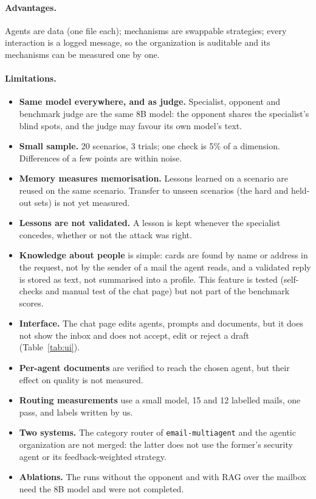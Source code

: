 \documentclass[11pt,a4paper]{article}
\newcommand{\code}[1]{\texttt{#1}}
\begin{document}
\paragraph{Advantages.} Agents are data (one file each); mechanisms are swappable strategies; every interaction is
a logged message, so the organization is auditable and its mechanisms can be measured one by one.

\paragraph{Limitations.}
\begin{itemize}
  \item \textbf{Same model everywhere, and as judge.} Specialist, opponent and benchmark judge are the same 8B model:
        the opponent shares the specialist's blind spots, and the judge may favour its own model's text.
  \item \textbf{Small sample.} 20 scenarios, 3 trials; one check is 5\% of a dimension. Differences of a few points
        are within noise.
  \item \textbf{Memory measures memorisation.} Lessons learned on a scenario are reused on the same scenario.
        Transfer to unseen scenarios (the hard and held-out sets) is not yet measured.
  \item \textbf{Lessons are not validated.} A lesson is kept whenever the specialist concedes, whether or not the
        attack was right.
  \item \textbf{Knowledge about people} is simple: cards are found by name or address in the request, not by the
        sender of a mail the agent reads, and a validated reply is stored as text, not summarised into a profile.
        This feature is tested (self-checks and manual test of the chat page) but not part of the benchmark scores.
  \item \textbf{Interface.} The chat page edits agents, prompts and documents, but it does not show the inbox and does
        not accept, edit or reject a draft (Table~\ref{tab:ui}).
  \item \textbf{Per-agent documents} are verified to reach the chosen agent, but their effect on quality is not measured.
  \item \textbf{Routing measurements} use a small model, 15 and 12 labelled mails, one pass, and labels written by us.
  \item \textbf{Two systems.} The category router of \code{email-multiagent} and the agentic organization are not merged:
        the latter does not use the former's security agent or its feedback-weighted strategy.
  \item \textbf{Ablations.} The runs without the opponent and with RAG over the mailbox need the 8B model and were
        not completed.
\end{itemize}
\end{document}
